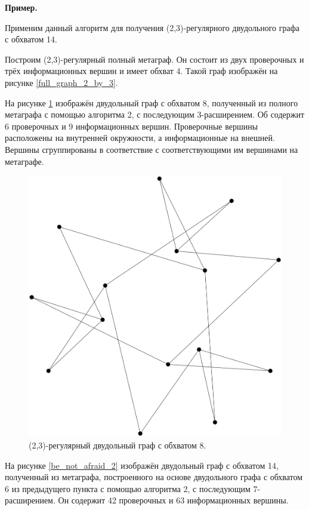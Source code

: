 \documentclass[14pt]{mmcs-article}
\begin{document}
\textbf{Пример.}

Применим данный алгоритм для получения (2,3)-регулярного двудольного графа с обхватом 14.

Построим (2,3)-регулярный полный метаграф. Он состоит из двух проверочных и трёх информационных вершин и имеет обхват 4. Такой граф изображён на рисунке \ref{full_graph_2_by_3}.

На рисунке \ref{be_not_afraid} изображён двудольный граф с обхватом 8, полученный из полного метаграфа с помощью алгоритма 2, с последующим 3-расширением. Об содержит 6 проверочных и 9 информационных вершин. Проверочные вершины расположены на внутренней окружности, а информационные на внешней. Вершины сгруппированы в соответствие с соответствующими им вершинами на метаграфе.

\begin{figure}[H]
    \centering
    \includegraphics[scale=0.2]{graph_2.png}
    \caption{ (2,3)-регулярный двудольный граф с обхватом 8. }
    \label{be_not_afraid}
\end{figure}

На рисунке \ref{be_not_afraid_2} изображён двудольный граф с обхватом 14, полученный из метаграфа, построенного на основе двудольного графа с обхватом 6 из предыдущего пункта с помощью алгоритма 2, с последующим 7-расширением. Он содержит 42 проверочных и 63 информационных вершины.
\end{document}
